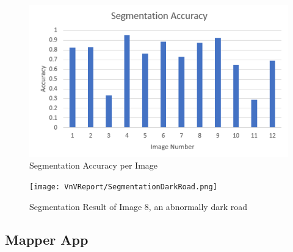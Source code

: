 \documentclass[12pt, titlepage]{article}
\begin{document}
\begin{figure}[h!]
  \begin{center} 
  \caption{Segmentation Accuracy per Image}
  \label{fig:segAccuracy}
        \includegraphics[width=1\textwidth]{VnVReport/SegmentationAccuracy.png}
  \end{center}
\end{figure}

\begin{figure}[h!]
  \begin{center} 
  \caption{Segmentation Result of Image 8, an abnormally dark road}
  \label{fig:segShadow}
        \texttt{[image: VnVReport/SegmentationDarkRoad.png]}
  \end{center}
\end{figure}

\clearpage

\subsection{Mapper App}
\label{subsec:mapperApp}
\end{document}
